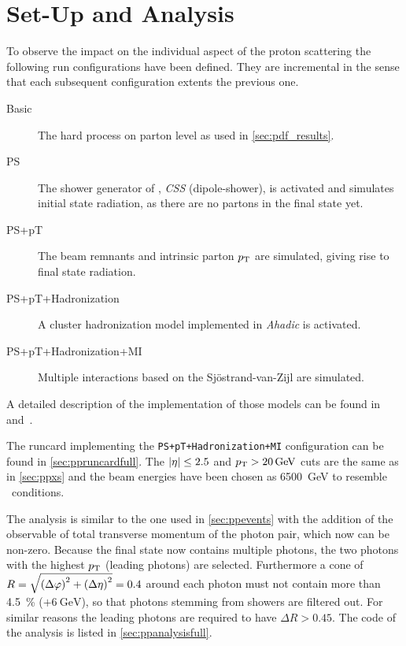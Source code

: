 \section{Set-Up and Analysis}%
\label{sec:setupan}

To observe the impact on the individual aspect of the proton
scattering the following run configurations have been defined. They
are incremental in the sense that each subsequent configuration
extents the previous one.

\begin{description}
\item[Basic] The hard process on parton level as used in \cref{sec:pdf_results}.
\item[PS] The shower generator of \sherpa, \emph{CSS} (dipole-shower),
  is activated and simulates initial state radiation, as there are no
  partons in the final state yet.
\item[PS+pT] The beam remnants and intrinsic parton
  \(p_\mathrm{T}\) are simulated, giving rise to final state radiation.
\item[PS+pT+Hadronization] A cluster hadronization model
  implemented in \emph{Ahadic} is activated.
\item[PS+pT+Hadronization+MI] Multiple interactions based on the
  Sj\"ostrand-van-Zijl are simulated.
\end{description}

A detailed description of the implementation of those models can be
found in~\cite{Gleisberg:2008ta} and~\cite{Bothmann:2019yzt}.

The runcard implementing the \texttt{PS+pT+Hadronization+MI}
configuration can be found in \cref{sec:ppruncardfull}. The
\(\abs{\eta}\leq 2.5\) and \(p_\mathrm{T} > \SI{20}{\giga\electronvolt}\) cuts are
the same as in \cref{sec:ppxs} and the beam energies have been chosen
as \SI{6500}{\giga\electronvolt} to resemble \lhc\ conditions.

The analysis is similar to the one used in \cref{sec:ppevents} with
the addition of the observable of total transverse momentum of the
photon pair, which now can be non-zero. Because the final state now
contains multiple photons, the two photons with the highest \(p_\mathrm{T}\)
(leading photons) are selected. Furthermore a cone of
\(R = \sqrt{\qty(\Delta\varphi)^2 + \qty(\Delta\eta)^2} = 0.4\) around
each photon must not contain more than \SI{4.5}{\percent}
(\(+ \SI{6}{\giga\electronvolt}\)), so that photons stemming from
showers are filtered out. For similar reasons the leading photons are
required to have \(\Delta R > 0.45\). The code of the analysis is
listed in \cref{sec:ppanalysisfull}.



